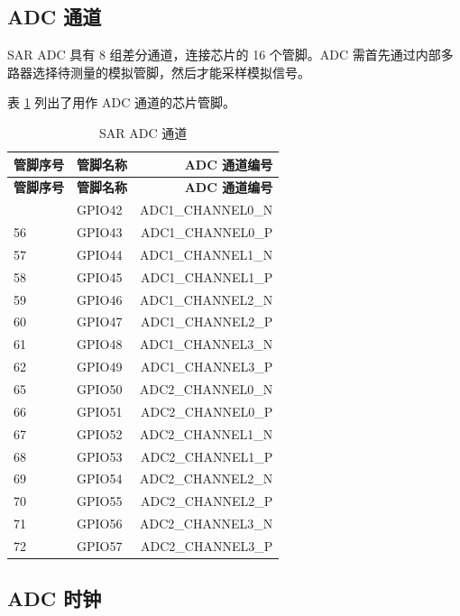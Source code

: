 \documentclass[main\_\_CN.tex]{subfiles}
\begin{document}
\subsection{ADC 通道}
\label{sec:sar-adc-channels}

SAR ADC 具有 8 组差分通道，连接芯片的 16 个管脚。ADC 需首先通过内部多路器选择待测量的模拟管脚，然后才能采样模拟信号。


表 \ref{tab:adc-sar-adc-input-signals} 列出了用作 ADC 通道的芯片管脚。

\begin{longtable}{ |l|l|r|}
    \caption{SAR ADC 通道}
    \label{tab:adc-sar-adc-input-signals}
    \\\hline
    \rowcolor{lightgray}
    \textbf{管脚序号} & \textbf{管脚名称} & \textbf{ADC 通道编号}  \\\hline
    \endfirsthead
    \hline
    \rowcolor{lightgray}
    \textbf{管脚序号} & \textbf{管脚名称} & \textbf{ADC 通道编号}  \\\hline
    \endhead
    \hline
    \endfoot
55 & GPIO42 & ADC1\_CHANNEL0\_N   \\ \hline
56 & GPIO43 & ADC1\_CHANNEL0\_P   \\ \hline
57 & GPIO44 & ADC1\_CHANNEL1\_N   \\ \hline
58 & GPIO45 & ADC1\_CHANNEL1\_P   \\ \hline
59 & GPIO46 & ADC1\_CHANNEL2\_N   \\ \hline
60 & GPIO47 & ADC1\_CHANNEL2\_P   \\ \hline
61 & GPIO48 & ADC1\_CHANNEL3\_N  \\ \hline
62 & GPIO49 & ADC1\_CHANNEL3\_P   \\ \hline
65 & GPIO50 & ADC2\_CHANNEL0\_N   \\ \hline
66 & GPIO51 & ADC2\_CHANNEL0\_P \\ \hline
67 & GPIO52 & ADC2\_CHANNEL1\_N   \\ \hline
68 & GPIO53 & ADC2\_CHANNEL1\_P  \\ \hline
69 & GPIO54 & ADC2\_CHANNEL2\_N  \\ \hline
70 & GPIO55 & ADC2\_CHANNEL2\_P  \\ \hline
71 & GPIO56 & ADC2\_CHANNEL3\_N  \\ \hline
72 & GPIO57 & ADC2\_CHANNEL3\_P   \\ \hline

\end{longtable}

\subsection{ADC 时钟}
\label{sec:sar-adc-clock}
\end{document}
